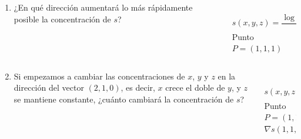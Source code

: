 \documentclass[aspectratio=149,10pt,xcolor=dvipsnames,t]{beamer}
\begin{document}
\begin{frame}
\begin{columns}
\begin{column}[T]{0.65\textwidth}
\begin{enumerate}
\item ¿En qué dirección aumentará lo más rápidamente posible la concentración de $s$?
\end{enumerate}
\end{column}
\begin{column}[T]{0.35\textwidth}
\\
$s(x,y,z)=\dfrac{\log(xy)}{z}$\\
Punto $P=(1,1,1)$
\end{column}
\end{columns}
\end{frame}


\begin{frame}
\begin{columns}
\begin{column}[T]{0.65\textwidth}
\begin{enumerate}
\setcounter{enumi}{1}
\item Si empezamos a cambiar las concentraciones de $x$, $y$ y $z$ en la dirección del vector
$(2,1,0)$, es decir, $x$ crece el doble de $y$, y $z$ se mantiene constante, ¿cuánto cambiará la concentración de $s$?
\end{enumerate}
\end{column}
\begin{column}[T]{0.35\textwidth}
\\
$s(x,y,z)=\dfrac{\log(xy)}{z}$\\
Punto $P=(1,1,1)$\\
$\nabla s(1,1,1)=(1,1,0)$
\end{column}
\end{columns}
\end{frame}
\end{document}
